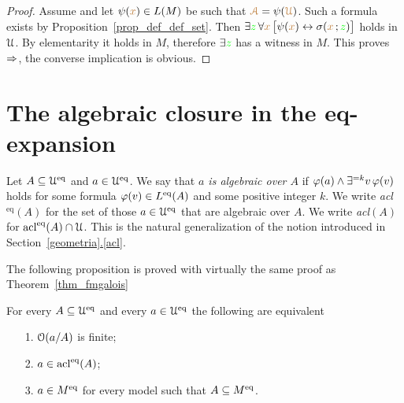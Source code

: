 \documentclass[creche.tex]{subfiles}
\begin{document}
\begin{proof}
Assume  and let $\psi({\color{brown} x})\in L(M)$ be such that ${\color{brown}\EuScript A}=\psi({\color{brown}\EuScript U})$.
Such a formula exists by Proposition~\ref{prop_def_def_set}.
Then $\exists{\color{green}z}\,\forall{\color{brown}x}\,\big[\psi({\color{brown} x})\leftrightarrow\sigma({\color{brown} x}\,;{\color{green} z})\big]$ holds in $\EuScript U$.
By elementarity it holds in $M$, therefore $\exists{\color{green}z}$ has a witness in $M$.
This proves $\Rightarrow$, the converse implication is obvious.
\end{proof}

\section{The algebraic closure in the eq-expansion}

Let $A\subseteq\EuScript U^{{\rm eq}}$ and $a\in\EuScript U^{{\rm eq}}$.
We say that \emph{$a$ is algebraic over $A$\/} if $\varphi(a)\wedge\exists^{=k}v\,\varphi(v)$ holds for some formula $\varphi(v)\in L^{{\rm eq}}(A)$ and some positive integer $k$.
We write \emph{acl$^\textrm{eq}(A)$\/} for the set of those $a\in\EuScript U^{{\rm eq}}$ that are algebraic over $A$.
We write \emph{acl$(A)$\/} for $\mathop{\rm acl}^{{\rm eq}}(A)\cap\EuScript U$.
This is the natural generalization of the notion introduced in Section~\hyperref[acl]{\ref*{geometria}.\ref*{acl}}.


The following proposition is proved with virtually the same proof as Theorem~\ref{thm_fmgalois}

\begin{theorem}\label{thm_Galois_alg=alg}
For every $A\subseteq\EuScript U^{{\rm eq}}$ and every $a\in\EuScript U^{{\rm eq}}$ the following are equivalent
\begin{itemize}
\item[1.] $\EuScript O(a/A)$ is finite;
\item[2.] $a\in\mathop{\rm acl}^{{\rm eq}}(A)$;
\item[3.] $a\in M^{{\rm eq}}$ for every model such that $A\subseteq M^{{\rm eq}}$.\QED
\end{itemize}
\end{theorem}
\end{document}
